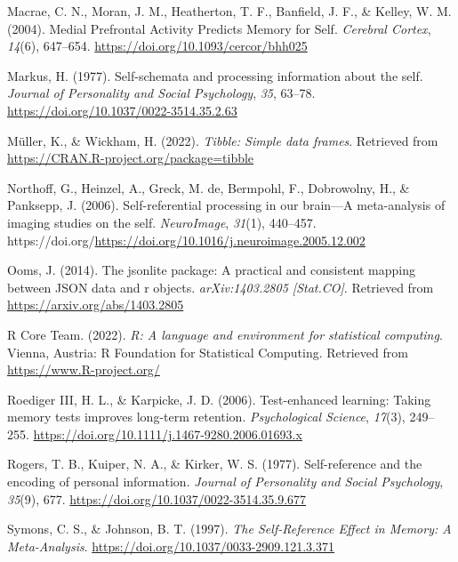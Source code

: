 \documentclass[
  man,floatsintext]{apa6}
\newlength{\cslhangindent}
\newlength{\cslentryspacingunit} %
\newenvironment{CSLReferences}[2] %
 {%
  \setlength{\parindent}{0pt}
  \ifodd #1
  \let\oldpar\par
  \def\par{\hangindent=\cslhangindent\oldpar}
  \fi
  \setlength{\parskip}{#2\cslentryspacingunit}
 }%
 {}
\begin{document}
\begin{CSLReferences}{1}{0}
\leavevmode{}%
Macrae, C. N., Moran, J. M., Heatherton, T. F., Banfield, J. F., \& Kelley, W. M. (2004). Medial {Prefrontal} {Activity} {Predicts} {Memory} for {Self}. \emph{Cerebral Cortex}, \emph{14}(6), 647--654. \url{https://doi.org/10.1093/cercor/bhh025}

\leavevmode{}%
Markus, H. (1977). Self-schemata and processing information about the self. \emph{Journal of Personality and Social Psychology}, \emph{35}, 63--78. \url{https://doi.org/10.1037/0022-3514.35.2.63}

\leavevmode{}%
Müller, K., \& Wickham, H. (2022). \emph{Tibble: Simple data frames}. Retrieved from \url{https://CRAN.R-project.org/package=tibble}

\leavevmode{}%
Northoff, G., Heinzel, A., Greck, M. de, Bermpohl, F., Dobrowolny, H., \& Panksepp, J. (2006). Self-referential processing in our brain---{A} meta-analysis of imaging studies on the self. \emph{NeuroImage}, \emph{31}(1), 440--457. https://doi.org/\url{https://doi.org/10.1016/j.neuroimage.2005.12.002}

\leavevmode{}%
Ooms, J. (2014). The jsonlite package: A practical and consistent mapping between JSON data and r objects. \emph{arXiv:1403.2805 {[}Stat.CO{]}}. Retrieved from \url{https://arxiv.org/abs/1403.2805}

\leavevmode{}%
R Core Team. (2022). \emph{R: A language and environment for statistical computing}. Vienna, Austria: R Foundation for Statistical Computing. Retrieved from \url{https://www.R-project.org/}

\leavevmode{}%
Roediger III, H. L., \& Karpicke, J. D. (2006). Test-enhanced learning: {Taking} memory tests improves long-term retention. \emph{Psychological Science}, \emph{17}(3), 249--255. \url{https://doi.org/10.1111/j.1467-9280.2006.01693.x}

\leavevmode{}%
Rogers, T. B., Kuiper, N. A., \& Kirker, W. S. (1977). Self-reference and the encoding of personal information. \emph{Journal of Personality and Social Psychology}, \emph{35}(9), 677. \url{https://doi.org/10.1037/0022-3514.35.9.677}

\leavevmode{}%
Symons, C. S., \& Johnson, B. T. (1997). \emph{The {Self}-{Reference} {Effect} in {Memory}: {A} {Meta}-{Analysis}}. \url{https://doi.org/10.1037/0033-2909.121.3.371}


\end{CSLReferences}
\end{document}

